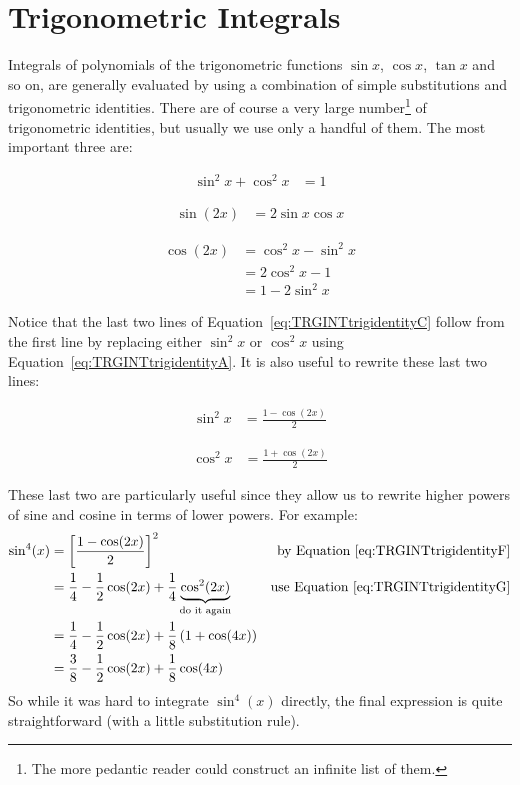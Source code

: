 \section{Trigonometric Integrals}\label{sec trigint}
Integrals of polynomials of the trigonometric functions $\sin x$, $\cos x$, $\tan x$ and
so on, are generally evaluated by using a combination of simple substitutions and
trigonometric identities. There are of course a very large number\footnote{The more
pedantic reader could construct an infinite list of them.} of trigonometric
identities, but usually we use only a handful of them. The most important three are:
\begin{impeqn}\label{eq:TRGINTtrigidentityA}
 \begin{align*}
\sin^2 x +\cos^2 x &= 1
\end{align*}
\end{impeqn}
\begin{impeqn}\label{eq:TRGINTtrigidentityB}
 \begin{align*}
\sin(2x)&=2\sin x\cos x
\end{align*}
\end{impeqn}
\begin{impeqn}\label{eq:TRGINTtrigidentityC}
 \begin{align*}
\cos(2x)&=\cos^2 x - \sin^2 x \\
        &=2\cos^2 x - 1 \\
        &=1-2\sin^2 x
\end{align*}
\end{impeqn}
Notice that the last two lines of Equation~\eqref{eq:TRGINTtrigidentityC} follow from
the first line by replacing either $\sin^2x$ or $\cos^2x$ using
Equation~\eqref{eq:TRGINTtrigidentityA}. It is also useful to rewrite these last two
lines:
\begin{impeqn}\label{eq:TRGINTtrigidentityF}
 \begin{align*}
\sin^2 x &= \frac{1-\cos(2x)}{2}
\end{align*}
\end{impeqn}
\begin{impeqn}\label{eq:TRGINTtrigidentityG}
 \begin{align*}
\cos^2 x &= \frac{1+\cos(2x)}{2}
\end{align*}
\end{impeqn}
These last two are particularly useful since they allow us to rewrite higher powers of
sine and cosine in terms of lower powers. For example:
\begin{align*}
  \sin^4(x) &= \left[ \frac{1-\cos(2x)}{2} \right]^2
&\text{by Equation~\eqref{eq:TRGINTtrigidentityF}}\\
   &= \frac{1}{4} - \frac{1}{2} \cos(2x) + \frac{1}{4}\underbrace{\cos^2(2x)}_{\text{do
 it again}} & \text{use Equation~\eqref{eq:TRGINTtrigidentityG}}\\
  &= \frac{1}{4} - \frac{1}{2} \cos(2x) + \frac{1}{8}\left(1 + \cos(4x) \right)\\
  &= \frac{3}{8} - \frac{1}{2} \cos(2x) + \frac{1}{8}\cos(4x)
\end{align*}
So while it was hard to integrate $\sin^4(x)$ directly, the final expression is quite
straightforward (with a little substitution rule).

